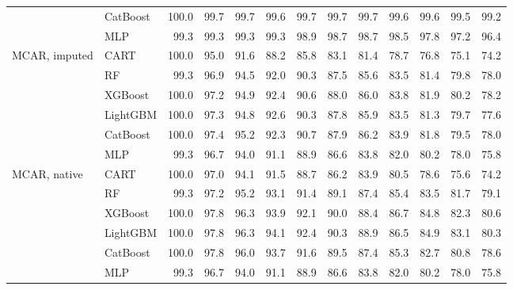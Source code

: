 \begin{table}[p]
\begin{tabular}{@{}llrrrrrrrrrrr@{}}
 & CatBoost & 100.0 & 99.7 & 99.7 & 99.6 & 99.7 & 99.7 & 99.7 & 99.6 & 99.6 & 99.5 & 99.2 \\
 & MLP & 99.3 & 99.3 & 99.3 & 99.3 & 98.9 & 98.7 & 98.7 & 98.5 & 97.8 & 97.2 & 96.4 \\
\midrule
MCAR, imputed & CART & 100.0 & 95.0 & 91.6 & 88.2 & 85.8 & 83.1 & 81.4 & 78.7 & 76.8 & 75.1 & 74.2 \\
 & RF & 99.3 & 96.9 & 94.5 & 92.0 & 90.3 & 87.5 & 85.6 & 83.5 & 81.4 & 79.8 & 78.0 \\
 & XGBoost & 100.0 & 97.2 & 94.9 & 92.4 & 90.6 & 88.0 & 86.0 & 83.8 & 81.9 & 80.2 & 78.2 \\
 & LightGBM & 100.0 & 97.3 & 94.8 & 92.6 & 90.3 & 87.8 & 85.9 & 83.5 & 81.3 & 79.7 & 77.6 \\
 & CatBoost & 100.0 & 97.4 & 95.2 & 92.3 & 90.7 & 87.9 & 86.2 & 83.9 & 81.8 & 79.5 & 78.0 \\
 & MLP & 99.3 & 96.7 & 94.0 & 91.1 & 88.9 & 86.6 & 83.8 & 82.0 & 80.2 & 78.0 & 75.8 \\
\midrule
MCAR, native & CART & 100.0 & 97.0 & 94.1 & 91.5 & 88.7 & 86.2 & 83.9 & 80.5 & 78.6 & 75.6 & 74.2 \\
 & RF & 99.3 & 97.2 & 95.2 & 93.1 & 91.4 & 89.1 & 87.4 & 85.4 & 83.5 & 81.7 & 79.1 \\
 & XGBoost & 100.0 & 97.8 & 96.3 & 93.9 & 92.1 & 90.0 & 88.4 & 86.7 & 84.8 & 82.3 & 80.6 \\
 & LightGBM & 100.0 & 97.8 & 96.3 & 94.1 & 92.4 & 90.3 & 88.9 & 86.5 & 84.9 & 83.1 & 80.3 \\
 & CatBoost & 100.0 & 97.8 & 96.0 & 93.7 & 91.6 & 89.5 & 87.4 & 85.3 & 82.7 & 80.8 & 78.6 \\
 & MLP & 99.3 & 96.7 & 94.0 & 91.1 & 88.9 & 86.6 & 83.8 & 82.0 & 80.2 & 78.0 & 75.8 \\
\bottomrule
\end{tabular}
\end{table}

